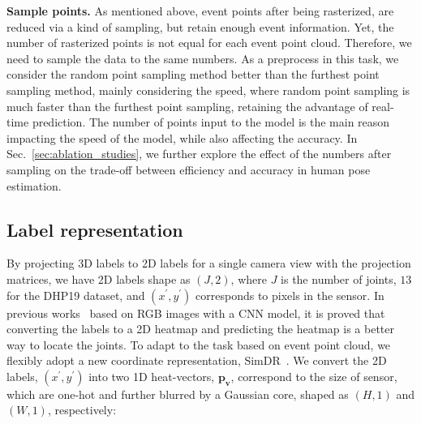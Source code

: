 \documentclass[10pt,twocolumn,letterpaper]{article}
\begin{document}
\noindent\textbf{Sample points.}
As mentioned above, event points after being rasterized, are reduced via a kind of sampling, but retain enough event information.
Yet, the number of rasterized points is not equal for each event point cloud.
Therefore, we need to sample the data to the same numbers.
As a preprocess in this task, we consider the random point sampling method better than the furthest point sampling method, mainly considering the speed, where random point sampling is much faster than the furthest point sampling, retaining the advantage of real-time prediction.
The number of points input to the model is the main reason impacting the speed of the model, while also affecting the accuracy.
In Sec.~\ref{sec:ablation_studies}, we further explore the effect of the numbers after sampling on the trade-off between efficiency and accuracy in human pose estimation.

\subsection{Label representation}
By projecting 3D labels to 2D labels for a single camera view with the projection matrices, we have 2D labels shape as $(J, 2)$, where $J$ is the number of joints, $13$ for the DHP19 dataset, and $(x^{\prime}, y^{\prime})$ corresponds to pixels in the sensor.
In previous works~\cite{newell2016stackedhourglass, wei2016convposemachain, xiao2018simbase} based on RGB images with a CNN model, it is proved that converting the labels to a 2D heatmap and predicting the heatmap is a better way to locate the joints.
To adapt to the task based on event point cloud, we flexibly adopt a new coordinate representation, SimDR~\cite{li20212dsimdr}.
We convert the 2D labels, $(x^{\prime}, y^{\prime})$ into two 1D heat-vectors, $\boldsymbol{p_{v}}$, correspond to the size of sensor, which are one-hot and further blurred by a Gaussian core, shaped as $(H, 1)$ and $(W, 1)$, respectively: 
\end{document}
